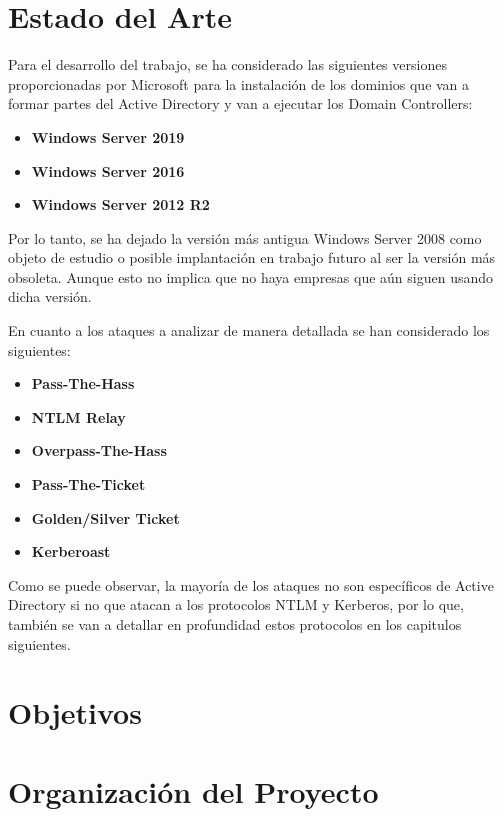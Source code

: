 \section{Estado del Arte}

Para el desarrollo del trabajo, se ha considerado las siguientes versiones proporcionadas por Microsoft para la instalación de los dominios que van a formar partes del Active Directory y van a ejecutar los Domain Controllers:\\

\begin{itemize}
\item \textbf{Windows Server 2019}
\item \textbf{Windows Server 2016}
\item \textbf{Windows Server 2012 R2}
\end{itemize}

Por lo tanto, se ha dejado la versión más antigua Windows Server 2008 como objeto de estudio o posible implantación en trabajo futuro al ser la versión más obsoleta. Aunque esto no implica que no haya empresas que aún siguen usando dicha versión. 

En cuanto a los ataques a analizar de manera detallada se han considerado los siguientes: 

\begin{itemize}
\item \textbf{Pass-The-Hass}
\item \textbf{NTLM Relay}
\item \textbf{Overpass-The-Hass}
\item \textbf{Pass-The-Ticket}
\item \textbf{Golden/Silver Ticket}
\item \textbf{Kerberoast}
\end{itemize}

Como se puede observar, la mayoría de los ataques no son específicos de Active Directory si no que atacan a los protocolos NTLM y Kerberos, por lo que, también se van a detallar en profundidad estos protocolos en los capitulos siguientes.


\section{Objetivos}




\section{Organización del Proyecto}

